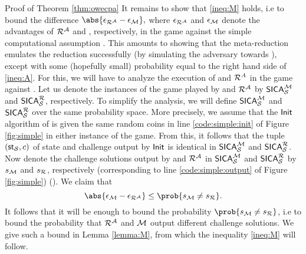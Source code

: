 \begin{namedproof}{Proof of Theorem \ref{thm:owecpa}}
  It remains to show that \eqref{ineq:M} holds, i.e to bound the difference
  \(
    \abs{\epsilon_{\redR^{\advA}} - \epsilon_{\redM}},
  \)
  where \(\epsilon_{\redR^{\advA}}\) and \(\epsilon_{\mathcal{M}}\) denote
  the advantages of \(\redR^{\advA}\) and \redM, respectively, in the game \SICA
  against the simple computational assumption \Simple.
  This amounts to showing that the meta-reduction \redM
  emulates the reduction \redR successfully
  (by simulating the adversary \advA towards \redR),
  except with some (hopefully small) probability equal to the right hand side of \eqref{ineq:A}.
  For this, we will have to analyze the execution of \redM and \(\redR^{A}\)
  in the game \SICA against \Simple.
  Let us denote the instances of the \SICA game played by \redM and \(\redR^{\advA}\)
  by \(\mathsf{SICA}_{\mathcal{S}}^{\mathcal{M}}\) and \(\SICA_{\Simple}^{\redR}\), respectively.
  To simplify the analysis, we will define \(\mathsf{SICA}_{\mathcal{S}}^{\mathcal{M}}\)
  and \(\SICA_{\Simple}^{\redR}\) over the same probability space.
  More precisely, we assume that the \(\mathsf{Init}\) algorithm of \Simple
  is given the same random coins in line \ref{code:simple:init} of Figure \ref{fig:simple}
  in either instance of the \SICA game.
  From this, it follows that the tuple \((\mathsf{st}_{\mathcal{S}},c)\) of state and challenge
  output by \(\mathsf{Init}\) is identical in \(\mathsf{SICA}_{\mathcal{S}}^{\mathcal{M}}\) and \(\SICA_{\Simple}^{\redR}\).
  Now denote the challenge solutions output by \redM and \(\redR^{\advA}\)
  in \(\mathsf{SICA}_{\mathcal{S}}^{\mathcal{M}}\) and \(\SICA_{\Simple}^{\redR}\)
  by \(s_{\mathcal{M}}\) and \(s_{\redR}\), respectively (corresponding to line \ref{code:simple:output} of Figure \ref{fig:simple})
  ().
  We claim that
  \begin{equation}\label{ineq:owecpa:diff}
    \abs{\epsilon_{\redM} - \epsilon_{\redR^{\advA}}} \le \prob{s_{\redM} \ne s_{\redR}}.
  \end{equation}
  It follows that it will be enough to bound the probability \(\prob{s_{\redM} \ne s_{\redR}}\),
  i.e to bound the probability that \(\redR^{\advA}\) and \(\mathcal{M}\)
  output different challenge solutions.
  We give such a bound in Lemma \ref{lemma:M}, from which the inequality \eqref{ineq:M} will follow.


\end{namedproof}
